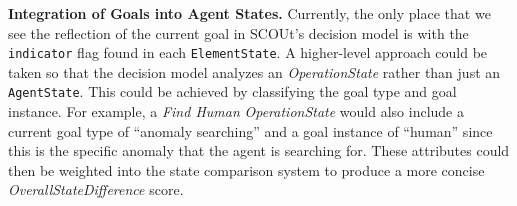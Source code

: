 \noindent
\textbf{Integration of Goals into Agent States.}
Currently, the only place that we see the reflection of the current goal in SCOUt's decision model is with the \texttt{indicator} flag found in each \texttt{ElementState}.
A higher-level approach could be taken so that the decision model analyzes an \textit{OperationState} rather than just an \texttt{AgentState}.
This could be achieved by classifying the goal type and goal instance.
For example, a \textit{Find Human} \textit{OperationState} would also include a current goal type of ``anomaly searching'' and a goal instance of ``human'' since this is the specific anomaly that the agent is searching for.
These attributes could then be weighted into the state comparison system to produce a more concise \textit{OverallStateDifference} score.
